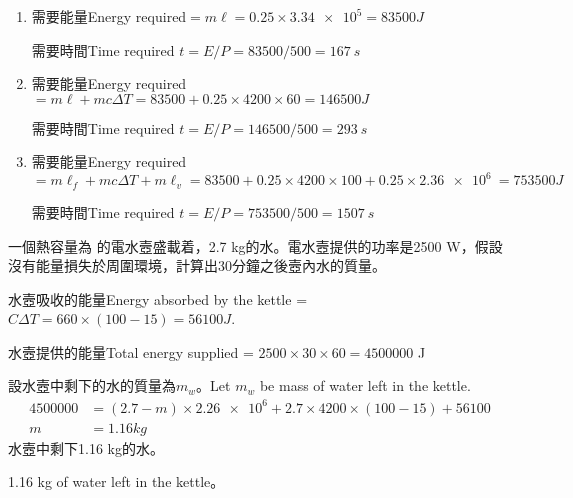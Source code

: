 {\begin{parts}
    \end{parts}
}{
    \sol
    \begin{enumerate}[label=(\alph*)]
        \item 需要能量Energy required$=m\ell=0.25\times \num{3.34e5}=83500\unit{J}$\par
              需要時間Time required $t=E/P=83500/500=\qty{167}{s}$
        \item 需要能量Energy required$=m\ell+mc\Delta T=83500+0.25\times 4200\times 60=146500\unit{J}$\par
              需要時間Time required $t=E/P=146500/500=\qty{293}{s}$
        \item 需要能量Energy required$=m\ell_f+mc\Delta T+m\ell_v=83500+0.25\times 4200\times 100+0.25\times\qty{2.36e6}{}=753500\unit{J}$\par
              需要時間Time required $t=E/P=753500/500=\qty{1507}{s}$
    \end{enumerate}

}

{
    一個熱容量為  的電水壼盛載着，2.7 kg的水。電水壼提供的功率是2500 W，假設沒有能量損失於周圍環境，計算出30分鐘之後壼內水的質量。
}{
    \sol
    水壼吸收的能量Energy absorbed by the kettle = $C\Delta T=660\times (100-15)=56100\unit{J}$.\par
    水壼提供的能量Total energy supplied = $2500\times 30\times 60=4500000$ J\par
    設水壼中剩下的水的質量為$m_w$。Let $m_w$ be mass of water left in the kettle.
    \begin{align*}
        4500000 & =(2.7-m)\times \num{2.26e6}+2.7\times 4200\times (100-15)+56100 \\
        m       & =1.16\unit{kg}
    \end{align*}
    水壼中剩下1.16 kg的水。\par
    1.16 kg of water left in the kettle。
}

